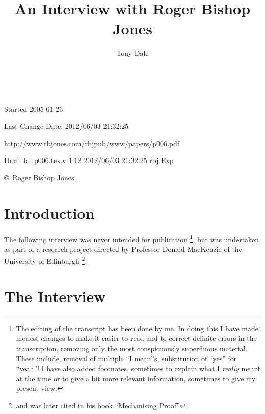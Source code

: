 \documentclass[10pt,titlepage]{book}
\title{An Interview with Roger Bishop Jones}
\author{Tony Dale}
\date{\ }
\begin{document}
\frontmatter

\begin{titlepage}
\maketitle

\vfill


\vfill

\begin{centering}

\vfill

\footnotesize{
Started 2005-01-26

Last Change $ $Date: 2012/06/03 21:32:25 $ $

\href{http://www.rbjones.com/rbjpub/www/papers/p006.pdf}{http://www.rbjones.com/rbjpub/www/papers/p006.pdf}

Draft $ $Id: p006.tex,v 1.12 2012/06/03 21:32:25 rbj Exp $ $

\copyright\ Roger Bishop Jones;

}%
\end{centering}

\end{titlepage}

{\parskip=0pt\tableofcontents}

\mainmatter

\chapter{Introduction}
The following interview was never intended for publication%
\footnote{
The editing of the transcript has been done by me.
In doing this I have made modest changes to make it easier to read and to correct definite errors in the transcription, removing only the most conspicuously superfluous material.
These include, removal of multiple ``I mean''s, substitution of ``yes'' for ``yeah''!
I have also added footnotes, sometimes to explain what I {\it really} meant at the time or to give a bit more relevant information, sometimes to give my present view.

}, but was undertaken as part of a research project directed by Professor Donald MacKenzie of the University of Edinburgh%
\footnote{
and was later cited in his book ``Mechanising Proof''\cite{mackenzie}}.

\chapter{The Interview}
\end{document}
